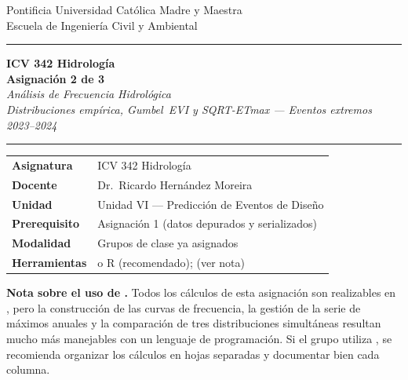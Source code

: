 \documentclass[11pt]{article}
\begin{document}
\begin{center}
  {\small\color{midgrey} Pontificia Universidad Católica Madre y Maestra\\
  	Escuela de Ingeniería Civil y Ambiental}

  \vspace{1.4cm}
  {\color{teal}\rule{\linewidth}{2pt}}
  \vspace{0.3cm}

  {\Large\bfseries\color{darkblue} ICV 342 Hidrología}\\[0.4em]
  {\LARGE\bfseries\color{darkblue} Asignación 2 de 3}\\[0.3em]
  {\large\itshape Análisis de Frecuencia Hidrológica\\
  Distribuciones empírica, Gumbel~EVI y SQRT-ETmax —
  Eventos extremos 2023–2024}

  \vspace{0.3cm}
  {\color{teal}\rule{\linewidth}{2pt}}
  \vspace{1.0cm}
\end{center}

\begin{center}
\begin{tabular}{ll}
\toprule
\textbf{Asignatura}   & ICV 342 Hidrología \\
\textbf{Docente}  & Dr.\ Ricardo Hernández Moreira\\
\textbf{Unidad}       & Unidad VI — Predicción de Eventos de Diseño \\
\textbf{Prerequisito} & Asignación 1 (datos depurados y serializados) \\
\textbf{Modalidad}    & Grupos de clase ya asignados \\
\textbf{Herramientas} & \python{} o R (recomendado); \excel{} (ver nota) \\
\bottomrule
\end{tabular}
\end{center}

\begin{warnbox}
\textbf{Nota sobre el uso de \excel{}.}
Todos los cálculos de esta asignación son realizables en \excel{}, pero la
construcción de las curvas de frecuencia, la gestión de la serie de máximos anuales
y la comparación de tres distribuciones simultáneas resultan mucho más manejables
con un lenguaje de programación.  Si el grupo utiliza \excel{}, se recomienda
organizar los cálculos en hojas separadas y documentar bien cada columna.
\end{warnbox}
\end{document}
